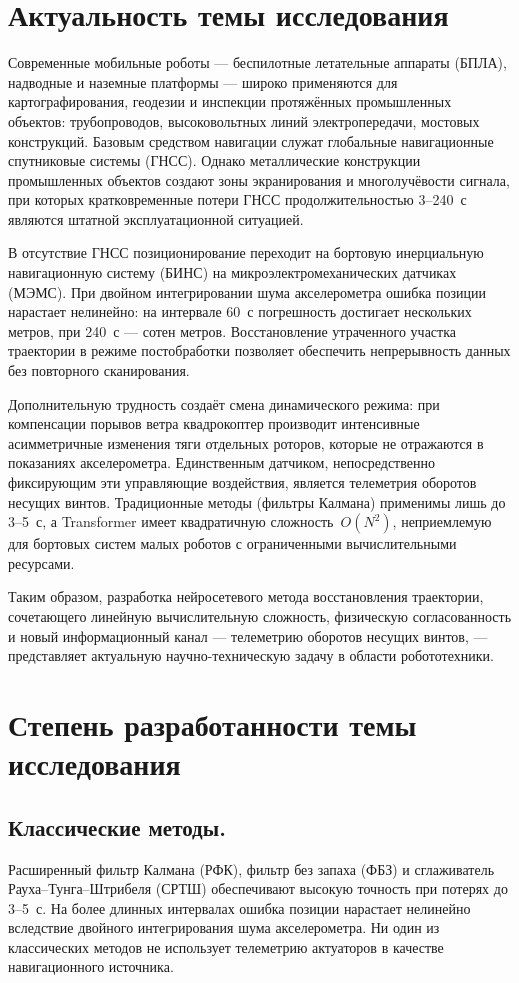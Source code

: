 
\section{Актуальность темы исследования}

Современные мобильные роботы --- беспилотные летательные аппараты (БПЛА), надводные и
наземные платформы --- широко применяются для картографирования, геодезии и инспекции
протяжённых промышленных объектов: трубопроводов, высоковольтных линий электропередачи,
мостовых конструкций. Базовым средством навигации служат глобальные навигационные
спутниковые системы (ГНСС). Однако металлические
конструкции промышленных объектов создают зоны экранирования и многолучёвости сигнала,
при которых кратковременные потери ГНСС продолжительностью 3--240~с являются штатной
эксплуатационной ситуацией.

В отсутствие ГНСС позиционирование переходит на бортовую инерциальную навигационную
систему (БИНС) на микроэлектромеханических датчиках (МЭМС). При двойном интегрировании
шума акселерометра ошибка позиции нарастает нелинейно: на интервале 60~с погрешность
достигает нескольких метров, при 240~с --- сотен метров. Восстановление утраченного участка
траектории в режиме постобработки позволяет обеспечить непрерывность данных без
повторного сканирования.

Дополнительную трудность создаёт смена динамического режима: при компенсации порывов
ветра квадрокоптер производит интенсивные асимметричные изменения тяги отдельных роторов,
которые не отражаются в показаниях акселерометра. Единственным датчиком, непосредственно
фиксирующим эти управляющие воздействия, является телеметрия оборотов несущих винтов.
Традиционные методы (фильтры Калмана) применимы лишь до 3--5~с, а Transformer имеет
квадратичную сложность~$O(N^2)$, неприемлемую для бортовых систем малых роботов с
ограниченными вычислительными ресурсами.

Таким образом, разработка нейросетевого метода восстановления траектории, сочетающего
линейную вычислительную сложность, физическую согласованность и новый информационный
канал --- телеметрию оборотов несущих винтов, --- представляет актуальную
научно-техническую задачу в области робототехники.

\section{Степень разработанности темы исследования}

\subsection{Классические методы.} 
Расширенный фильтр Калмана (РФК), фильтр без запаха (ФБЗ)
и сглаживатель Рауха--Тунга--Штрибеля (СРТШ) обеспечивают высокую точность при потерях
до 3--5~с. На более длинных интервалах ошибка позиции нарастает нелинейно вследствие
двойного интегрирования шума акселерометра. Ни один из классических методов не использует телеметрию актуаторов в качестве
навигационного источника.

